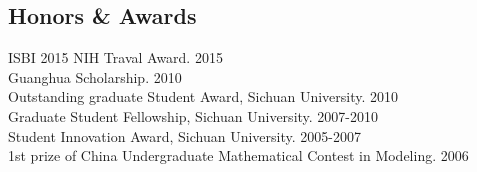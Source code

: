 \documentclass[line,margin]{res}
\begin{document}
\begin{resume}
%


 
\section{\sc Honors \& Awards}

ISBI 2015 NIH Traval Award. \hfill      2015\\
Guanghua Scholarship.  \hfill       2010\\
Outstanding graduate Student Award, Sichuan University. \hfill       2010\\
Graduate Student Fellowship, Sichuan University.  \hfill       2007-2010\\
Student Innovation Award, Sichuan University.  \hfill        2005-2007 \\%
1st prize of China Undergraduate Mathematical Contest in Modeling.  \hfill       2006



\end{resume}

%
%
\end{document}
